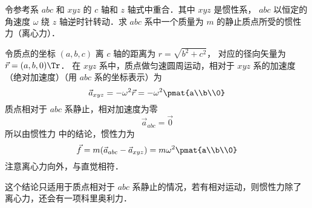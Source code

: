 

令参考系 $abc$ 和 $xyz$ 的 $c$ 轴和 $z$ 轴式中重合．其中 $xyz$ 是惯性系， $abc$ 以恒定的角速度 $\omega$ 绕 $z$ 轴逆时针转动．求 $abc$ 系中一个质量为 $m$ 的静止质点所受的惯性力（离心力）．

令质点的坐标 $(a,b,c)$ 离 $c$ 轴的距离为 $r = \sqrt{b^2 + c^2}$， 对应的径向矢量为 $\vec r = (a,b,0)\Tr$． 在 $xyz$ 系中，质点做匀速圆周运动，相对于 $xyz$ 系的加速度（绝对加速度）（用 $abc$ 系的坐标表示）为
\begin{equation}
\vec a_{xyz} =  - \omega ^2 \vec r =  - \omega ^2 \pmat{a\\b\\0}
\end{equation}
质点相对于 $abc$ 系静止，相对加速度为零
\begin{equation}
\vec a_{abc} = \vec 0
\end{equation}
所以由惯性力 中的结论，惯性力为
\begin{equation}
\vec f = m(\vec a_{abc} - \vec a_{xyz}) = m\omega ^2\pmat{a\\b\\0}
\end{equation}
注意离心力向外，与直觉相符．

这个结论只适用于质点相对于 $abc$ 系静止的情况，若有相对运动，则惯性力除了离心力，还会有一项科里奥利力．